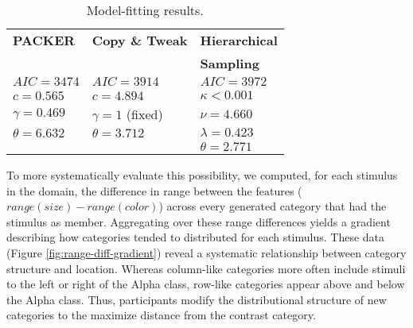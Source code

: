 \documentclass[10pt,letterpaper]{article}
\newcommand\inputpgf[2]{{
\let\pgfimageWithoutPath\pgfimage
\renewcommand{\pgfimage}[2][]{\pgfimageWithoutPath[##1]{#1/##2}}

}}
\begin{document}
\begin{table}
\centering
\caption{Model-fitting results.}
\label{table:model-fits}
\begin{tabular}{ l l l}
\\
 \textbf{PACKER} & \textbf{Copy \& Tweak} & \textbf{Hierarchical} \\
 & & \textbf{Sampling} \\ \hline
 $AIC = 3474$ & $AIC = 3914$ & $AIC = 3972$  \\ 
 $c=0.565$      & $c=4.894$  & $\kappa<0.001$\\
 $\gamma=0.469$ & $\gamma=1$ (fixed) & $\nu=4.660$ \\ 
 $\theta=6.632$ & $\theta=3.712$ &  $\lambda=0.423$  \\ 
  &  & $\theta = 2.771$  \\ 
\end{tabular}
\end{table}

\begin{figure*}
    \begin{center}
    \inputpgf{figs/}{range-diff-gradients.pgf}
    \caption{Generated category structure as a function of location. Orange areas in each gradient correspond to stimuli that were commonly generated into category possessing greater y-axis range (columns). Purple areas correspond to categories possessing greater x-axis range. White areas correspond to equal range along both features (or infrequent generation).}
    \label{fig:range-diff-gradient}
    \end{center}
\end{figure*}

To more systematically evaluate this possibility, we computed, for each stimulus in the domain, the difference in range between the features ($range(size) - range(color)$) across every generated category that had the stimulus as member. Aggregating over these range differences yields a gradient describing how categories tended to distributed for each stimulus. These data (Figure \ref{fig:range-diff-gradient}) reveal a systematic relationship between category structure and location. Whereas column-like categories more often include stimuli to the left or right of the Alpha class, row-like categories appear above and below the Alpha class.  Thus, participants modify the distributional structure of new categories to the maximize distance from the contrast category.
\end{document}
